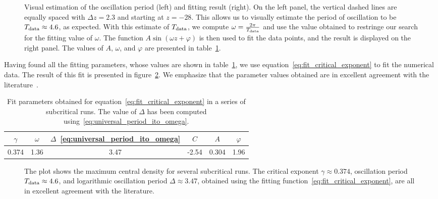 \documentclass[a4paper,11pt]{article}
\newcommand{\g}{\gamma}
\newcommand{\D}{\Delta}
\newcommand{\lrpar}[1]{\left( #1 \right)}
\begin{document}
\begin{figure}[H]
  \centering
  
  \caption[Visual estimation of the oscillation period and fit.]{Visual estimation of the oscillation period (left) and fitting result (right). On the left panel, the vertical dashed lines are equally spaced with $\D z = 2.3$ and starting at $z=-28$. This allows us to visually estimate the period of oscillation to be $T_{\rm data}\approx4.6$, as expected. With this estimate of $T_{\rm data}$, we compute $\omega = \frac{2\pi}{T_{\rm data}}$ and use the value obtained to restringe our search for the fitting value of $\omega$. The function $A\sin\lrpar{\omega z+\varphi}$ is then used to fit the data points, and the result is displayed on the right panel. The values of $A$, $\omega$, and $\varphi$ are presented in table~\ref{tab:fit_critical_exponent}.}
  \label{fig:critical_exponent_oscillation}
\end{figure}

Having found all the fitting parameters, whose values are shown in table~\ref{tab:fit_critical_exponent}, we use equation~\eqref{eq:fit_critical_exponent} to fit the numerical data. The result of this fit is presented in figure~\ref{fig:critical_exponent}. We emphasize that the parameter values obtained are in excellent agreement with the literature~\cite{PhysRevLett.70.9,Baumgarte_2018,PhysRevD.55.R440,PhysRevD.92.084037}.

\begin{table}[ht]
  \centering
  \begin{tabular}{cccccc}
    \hline
    \hline
    $\g$ & $\omega$ & $\D$~\eqref{eq:universal_period_ito_omega} & $C$ & $A$ & $\varphi$\\
    \hline
    0.374 & 1.36 & 3.47 & -2.54 & 0.304 & 1.96\\
    \hline
    \hline
  \end{tabular}
  \caption[Fit parameters for the behaviour of the central energy density in a series of subcritical runs.]{Fit parameters obtained for equation~\eqref{eq:fit_critical_exponent} in a series of subcritical runs. The value of $\D$ has been computed using~\eqref{eq:universal_period_ito_omega}.}
  \label{tab:fit_critical_exponent}
\end{table}

\begin{figure}[H]
  \centering
  
  \caption[Central energy density near criticality.]{The plot shows the maximum central density for several subcritical runs. The critical exponent $\gamma\approx0.374$, oscillation period $T_{\rm data}\approx4.6$, and logarithmic oscillation period $\D\approx3.47$, obtained using the fitting function~\eqref{eq:fit_critical_exponent}, are all in excellent agreement with the literature.}
  \label{fig:critical_exponent}
\end{figure}
\end{document}
